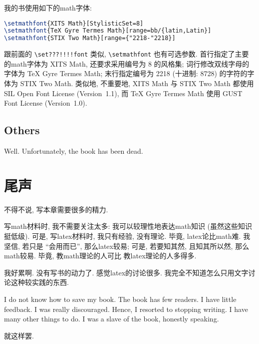 我的书使用如下的\gls{math}字体:
\begin{lstlisting}[language=TeX]
\setmathfont{XITS Math}[StylisticSet=8]
\setmathfont{TeX Gyre Termes Math}[range=bb/{latin,Latin}]
\setmathfont{STIX Two Math}[range={"2218-"2218}]
\end{lstlisting}
跟前面的 \verb`\set???!!!!font` 类似,
\verb`\setmathfont` 也有可选参数.
首行指定了主要的\gls{math}字体为 XITS Math,
还要求采用编号为 8 的风格集;
词行修改双线字母的字体为 TeX Gyre Termes Math;
末行指定编号为 2218 (十进制: \num{8728})
的字符的字体为 STIX Two Math.
类似地, 不重要地,
XITS Math 与 STIX Two Math
都使用 SIL Open Font License (Version~1.1),
而 TeX Gyre Termes Math
使用 GUST Font License (Version~1.0).

\subsection{Others}

Well.
Unfortunately,
the book has been dead.

\section{尾声}

不得不说, 写本章需要很多的精力.

写\gls{math}材料时, 我不需要关注太多:
我可以较理性地表达\gls{math}知识
(虽然这些知识挺低级).
可是, 写\gls{latex}材料时, 我只有经验, 没有理论.
毕竟, \gls{latex}论比\gls{math}难.
我坚信, 若只是 ``会用而已'', 那么\gls{latex}较易;
可是, 若要知其然, 且知其所以然,
那么\gls{math}较易.
毕竟, 教\gls{math}理论的人可比%
教\gls{latex}理论的人多得多.

我好累啊.
没有写书的动力了.
感觉\gls{latex}的讨论很多.
我完全不知道怎么只用文字讨论这种较实践的东西.

I do not know how to save my book.
The book has few readers.
I have little feedback.
I was really discouraged.
Hence, I resorted to stopping writing.
I have many other things to do.
I was a slave of the book, honestly speaking.

就这样罢.
